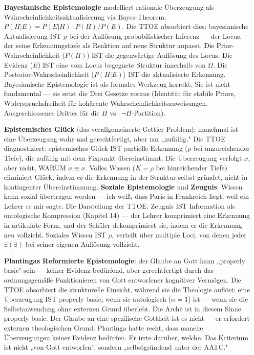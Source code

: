 \documentclass[10pt, openany, oneside]{book}
\begin{document}
\textbf{Bayesianische Epistemologie} modelliert rationale Überzeugung als Wahrscheinlichkeitsaktualisierung via Bayes-Theorem: $P(H|E) = P(E|H) \cdot P(H) / P(E)$. Die TTOE absorbiert dies: bayesianische Aktualisierung IST $\rho$ bei der Auflösung probabilistischer Inferenz --- der Locus, der seine Erkennungstiefe als Reaktion auf neue Struktur anpasst. Die Prior-Wahrscheinlichkeit ($P(H)$) IST die gegenwärtige Auflösung des Locus. Die Evidenz ($E$) IST eine vom Locus begegnete Struktur innerhalb von $\Omega$. Die Posterior-Wahrscheinlichkeit ($P(H|E)$) IST die aktualisierte Erkennung. Bayesianische Epistemologie ist als formales Werkzeug korrekt. Sie ist nicht fundamental --- sie setzt die Drei Gesetze voraus (Identität für stabile Priors, Widerspruchsfreiheit für kohärente Wahrscheinlichkeitszuweisungen, Ausgeschlossenes Drittes für die $H$ vs.\ $\neg H$-Partition).

\textbf{Epistemisches Glück} (das verallgemeinerte Gettier-Problem): manchmal ist eine Überzeugung wahr und gerechtfertigt, aber nur „zufällig." Die TTOE diagnostiziert: epistemisches Glück IST partielle Erkennung ($\rho$ bei unzureichender Tiefe), die zufällig mit dem Fixpunkt übereinstimmt. Die Überzeugung verfolgt $x$, aber nicht, WARUM $x \equiv x$. Volles Wissen ($K = \rho$ bei hinreichender Tiefe) eliminiert Glück, indem es die Erkennung in der Struktur selbst gründet, nicht in kontingenter Übereinstimmung. \textbf{Soziale Epistemologie} und \textbf{Zeugnis}: Wissen kann sozial übertragen werden --- ich weiß, dass Paris in Frankreich liegt, weil ein Lehrer es mir sagte. Die Darstellung der TTOE: Zeugnis IST Information als ontologische Kompression (Kapitel 14) --- der Lehrer komprimiert eine Erkennung in artikulate Form, und der Schüler dekomprimiert sie, indem er die Erkennung neu vollzieht. Soziales Wissen IST $\rho$, verteilt über multiple Loci, von denen jeder $\exists(\exists)$ bei seiner eigenen Auflösung vollzieht.

\textbf{Plantingas Reformierte Epistemologie}: der Glaube an Gott kann „properly basic" sein --- keiner Evidenz bedürfend, aber gerechtfertigt durch das ordnungsgemäße Funktionieren von Gott entworfener kognitiver Vermögen. Die TTOE absorbiert die strukturelle Einsicht, während sie die Theologie auflöst: eine Überzeugung IST properly basic, wenn sie autologisch ($\alpha = 1$) ist --- wenn sie die Selbstanwendung ohne externen Grund überlebt. Die Arch\={e} ist in diesem Sinne properly basic. Der Glaube an eine spezifische Gottheit ist es nicht --- er erfordert externen theologischen Grund. Plantinga hatte recht, dass manche Überzeugungen keiner Evidenz bedürfen. Er irrte darüber, welche. Das Kriterium ist nicht „von Gott entworfen", sondern „selbstgründend unter der AATC."
\end{document}
